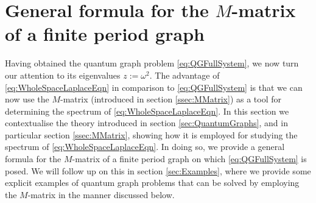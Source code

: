 \section{General formula for the $M$-matrix of a finite period graph} \label{sec:ScalarDiscussion}
Having obtained the quantum graph problem \eqref{eq:QGFullSystem}, we now turn our attention to its eigenvalues $z := \omega^2$.
The advantage of \eqref{eq:WholeSpaceLaplaceEqn} in comparison to \eqref{eq:QGFullSystem} is that we can now use the $M$-matrix (introduced in section \ref{ssec:MMatrix}) as a tool for determining the spectrum of \eqref{eq:WholeSpaceLaplaceEqn}.
In this section we contextualise the theory introduced in section \ref{sec:QuantumGraphs}, and in particular section \ref{ssec:MMatrix}, showing how it is employed for studying the spectrum of \eqref{eq:WholeSpaceLaplaceEqn}.
In doing so, we provide a general formula for the $M$-matrix of a finite period graph on which \eqref{eq:QGFullSystem} is posed.
We will follow up on this in section \ref{sec:Examples}, where we provide some explicit examples of quantum graph problems that can be solved by employing the $M$-matrix in the manner discussed below.

